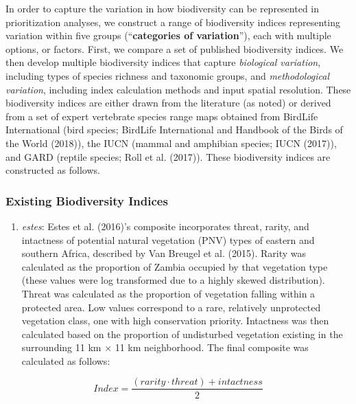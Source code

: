 \documentclass[
]{article}
\providecommand{\tightlist}{%
  \setlength{\itemsep}{0pt}\setlength{\parskip}{0pt}}
\begin{document}
In order to capture the variation in how biodiversity can be represented in prioritization analyses, we construct a range of biodiversity indices representing variation within five groups (``\textbf{categories of variation}''), each with multiple options, or factors. First, we compare a set of published biodiversity indices. We then develop multiple biodiversity indices that capture \emph{biological variation}, including types of species richness and taxonomic groups, and \emph{methodological variation}, including index calculation methods and input spatial resolution. These biodiversity indices are either drawn from the literature (as noted) or derived from a set of expert vertebrate species range maps obtained from BirdLife International (bird species; BirdLife International and Handbook of the Birds of the World (2018)), the IUCN (mammal and amphibian species; IUCN (2017)), and GARD (reptile species; Roll et al. (2017)). These biodiversity indices are constructed as follows.

\hypertarget{existing-biodiversity-indices}{%
\subsubsection{Existing Biodiversity Indices}\label{existing-biodiversity-indices}}

\begin{enumerate}
\def\labelenumi{(\arabic{enumi})}
\tightlist
\item
  \emph{estes}: Estes et al. (2016)'s composite incorporates threat, rarity, and intactness of potential natural vegetation (PNV) types of eastern and southern Africa, described by Van Breugel et al. (2015). Rarity was calculated as the proportion of Zambia occupied by that vegetation type (these values were log transformed due to a highly skewed distribution). Threat was calculated as the proportion of vegetation falling within a protected area. Low values correspond to a rare, relatively unprotected vegetation class, one with high conservation priority. Intactness was then calculated based on the proportion of undisturbed vegetation existing in the surrounding 11 km \(\times\) 11 km neighborhood. The final composite was calculated as follows:
\end{enumerate}

\[ Index = \frac{(rarity \cdot threat) + intactness}{2} \]
\end{document}
